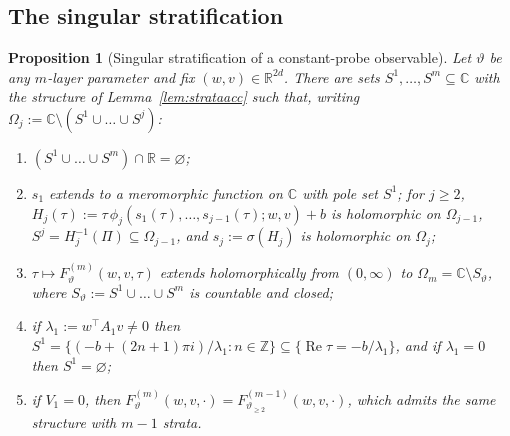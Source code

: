 \documentclass[11pt]{article}
\newtheorem{proposition}[theorem]{Proposition}
\theoremstyle{definition}
\theoremstyle{remark}
\theoremstyle{plain}
\newcommand{\R}{\mathbb{R}}
\newcommand{\C}{\mathbb{C}}
\newcommand{\Z}{\mathbb{Z}}
\newcommand{\sig}{\sigma}
\begin{document}
\subsection{The singular stratification}

\begin{proposition}[Singular stratification of a constant-probe observable]
\label{prop:strat}
Let $\vartheta$ be any $m$-layer parameter and fix $(w,v)\in\R^{2d}$.  There are sets
$S^1,\dots,S^m\subseteq\C$ with the structure of Lemma~\ref{lem:strataacc} such that,
writing $\Omega_j:=\C\setminus(S^1\cup\dots\cup S^{j})$:
\begin{enumerate}
\item[(a)] $(S^1\cup\dots\cup S^m)\cap\R=\varnothing$;
\item[(b)] $s_1$ extends to a meromorphic function on $\C$ with pole set $S^1$; for
$j\ge2$, $H_j(\tau):=\tau\,\phi_j(s_1(\tau),\dots,s_{j-1}(\tau);w,v)+b$ is holomorphic on
$\Omega_{j-1}$, $S^j=H_j^{-1}(\Pi)\subseteq\Omega_{j-1}$, and
$s_j:=\sig(H_j)$ is holomorphic on $\Omega_j$;
\item[(c)] $\tau\mapsto F^{(m)}_\vartheta(w,v,\tau)$ extends holomorphically from
$(0,\infty)$ to $\Omega_m=\C\setminus S_\vartheta$, where
$S_\vartheta:=S^1\cup\dots\cup S^m$ is countable and closed;
\item[(d)] if $\lambda_1:=w^\top A_1v\neq0$ then
$S^1=\{(-b+(2n+1)\pi i)/\lambda_1:n\in\Z\}\subseteq\{\operatorname{Re}\tau=-b/\lambda_1\}$,
and if $\lambda_1=0$ then $S^1=\varnothing$;
\item[(e)] if $V_1=0$, then $F^{(m)}_\vartheta(w,v,\cdot)=F^{(m-1)}_{\vartheta_{\ge2}}
(w,v,\cdot)$, which admits the same structure with $m-1$ strata.
\end{enumerate}
\end{proposition}
\end{document}
